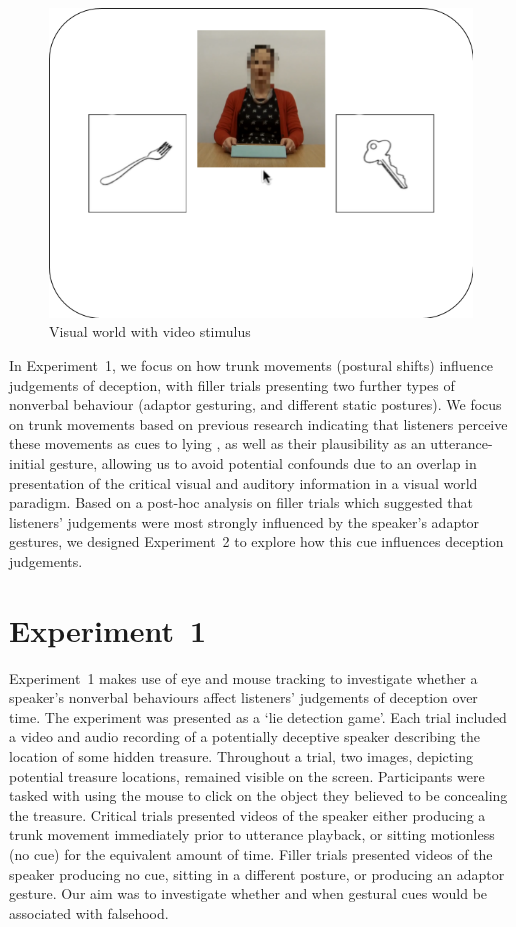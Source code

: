 \documentclass[a4paper,man,natbib]{apa6}
\begin{document}
\begin{figure}[Ht]
  \centering
	\includegraphics[width=\linewidth]{./img/e7_layout.png}
  \caption{Visual world with video stimulus}
  \label{fig:v1_layout}
\end{figure}

In Experiment~1, we focus on how trunk movements (postural shifts) influence judgements of deception, with filler trials presenting two further types of nonverbal behaviour (adaptor gesturing, and different static postures).
We focus on trunk movements based on previous research indicating that listeners perceive these movements as cues to lying \citep{Vrij1996a, Zuckerman1981}, as well as their plausibility as an utterance-initial gesture, allowing us to avoid potential confounds due to an overlap in presentation of the critical visual and auditory information in a visual world paradigm.
Based on a post-hoc analysis on filler trials which suggested that listeners' judgements were most strongly influenced by the speaker's adaptor gestures, we designed Experiment~2 to explore how this cue influences deception judgements.

\section{Experiment~1}
Experiment~1 makes use of eye  and mouse tracking to investigate whether a speaker's nonverbal behaviours affect listeners' judgements of deception over time. 
The experiment was presented as a `lie detection game'.
Each trial included a video and audio recording of a potentially deceptive speaker describing the location of some hidden treasure.
Throughout a trial, two images, depicting potential treasure locations, remained visible on the screen. 
Participants were tasked with using the mouse to click on the object they believed to be concealing the treasure.
Critical trials presented videos of the speaker either producing a trunk movement immediately prior to utterance playback, or sitting motionless (no cue) for the equivalent amount of time.
Filler trials presented videos of the speaker producing no cue, sitting in a different posture, or producing an adaptor gesture. 
Our aim was to investigate whether and when gestural cues would be associated with falsehood.
\end{document}
